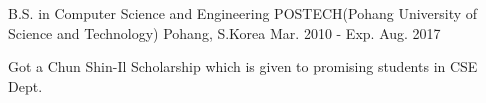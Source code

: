 

\begin{cventries}

   
  \cventry
    {B.S. in Computer Science and Engineering} %
    {POSTECH(Pohang University of Science and Technology)} %
    {Pohang, S.Korea} %
    {Mar. 2010 - Exp. Aug. 2017} %
    {
      \begin{cvitems} %
        \item {Got a Chun Shin-Il Scholarship which is given to promising students in CSE Dept.}
      \end{cvitems}
    }

\end{cventries}
